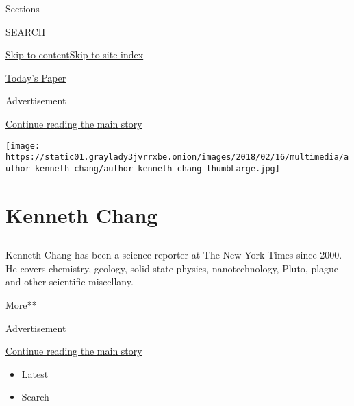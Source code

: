 Sections

SEARCH

\protect\hyperlink{site-content}{Skip to
content}\protect\hyperlink{site-index}{Skip to site index}

\href{https://myaccount.nytimes3xbfgragh.onion/auth/login?response_type=cookie\&client_id=vi}{}

\href{https://www.nytimes3xbfgragh.onion/section/todayspaper}{Today's
Paper}

Advertisement

\protect\hyperlink{after-top}{Continue reading the main story}

\texttt{[image: https://static01.graylady3jvrrxbe.onion/images/2018/02/16/multimedia/author-kenneth-chang/author-kenneth-chang-thumbLarge.jpg]}

\hypertarget{kenneth-chang}{%
\section{Kenneth Chang}\label{kenneth-chang}}

\subsection{}

Kenneth Chang has been a science reporter at The New York Times since
2000. He covers chemistry, geology, solid state physics, nanotechnology,
Pluto, plague and other scientific miscellany.

More**

Advertisement

\protect\hyperlink{after-mid1}{Continue reading the main story}

\begin{itemize}
\tightlist
\item
  \protect\hyperlink{stream-panel}{Latest}
\item
  Search
\end{itemize}

